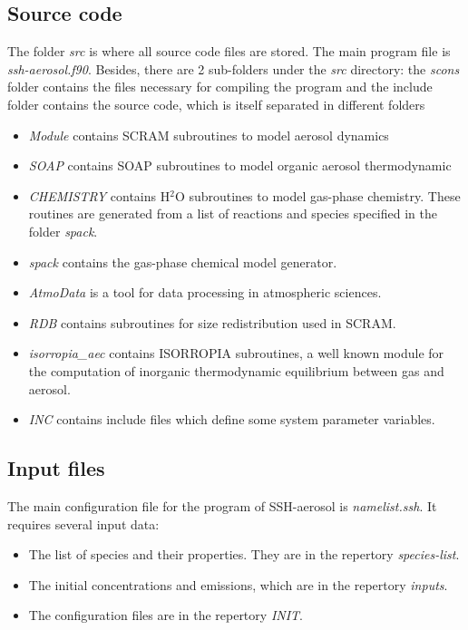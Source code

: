 \documentclass[a4paper,11pt]{article}
\begin{document}
\subsection{Source code}
The folder {\it{src}} is where all source code files are stored. The main program file is {\it{ssh-aerosol.f90}}.  Besides, there are 2 sub-folders under the {\it{src}} directory: the {\it{scons}} folder contains the files necessary for compiling the program and the include folder contains the source code, which is itself separated in different folders
\begin{itemize}
\item {\it{Module}} contains SCRAM subroutines to model aerosol dynamics
\item {\it{SOAP}} contains SOAP subroutines to model organic aerosol thermodynamic
\item {\it{CHEMISTRY}} contains H$^2$O subroutines to model gas-phase chemistry. These routines are generated from a list of reactions and species specified in the folder {\it{spack}}.
\item {\it{spack}} contains the gas-phase chemical model generator.
\item {\it{AtmoData}} is a tool for data processing in atmospheric sciences.
 \item {\it{RDB}} contains subroutines for size redistribution used in SCRAM.
\item {\it{isorropia\_aec}} contains ISORROPIA subroutines, a well known module for the computation of inorganic thermodynamic equilibrium between gas and aerosol.
\item {\it{INC}} contains include files which define some system parameter variables.
\end {itemize}

\subsection{Input files}
The main configuration file for the program of SSH-aerosol is {\it{namelist.ssh}}. It requires several input data:
\begin{itemize}
\item The list of species and their properties. They are in the repertory {\it{species-list}}. 
\item The initial concentrations and emissions, which are in the repertory {\it{inputs}}.
\item The configuration files are in the repertory {\it{INIT}}.
\end{itemize}
\end{document}
